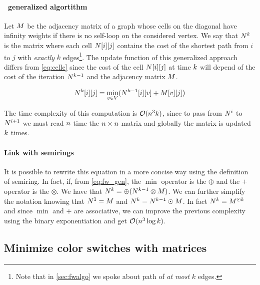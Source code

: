 \paragraph{\FW\ generalized algortithm} Let $M$ be the adjacency matrix of a graph whose cells on the diagonal have infinity weights if there is no self-loop on the considered vertex. We say that $N^k$ is the matrix where each cell $N[i][j]$ contains the cost of the shortest path from $i$ to $j$ with \textit{exactly} $k$ edges\footnote{Note that in \cref{sec:fwalgo} we spoke about path of \textit{at most} $k$ edges.}. The update function of this generalized approach differs from \cref{eq:cellc} since the cost of the cell $N[i][j]$ at time $k$ will depend of the cost of the iteration $N^{k - 1}$ and the adjacency matrix $M$.

\begin{equation}
  \label{eq:fw_gen}
  N^k[i][j] = \min_{v \in V} (N^{k-1}[i][v] + M[v][j])
\end{equation}

The time complexity of this computation is $\mathcal{O}(n^3 k)$, since to pass from $N^i$ to $N^{i+1}$ we must read $n$ time the $n \times n$ matrix and globally the matrix is updated $k$ times.

\paragraph{Link with semirings} It is possible to rewrite this equation in a more concise way using the definition of semiring. In fact, if, from \cref{eq:fw_gen}, the $\min$ operator is the $\oplus$ and the $+$ operator is the $\otimes$. We have that $N^k = \oplus (N^{k-1} \otimes M)$. We can further simplify the notation knowing that $N^1 = M$ and $N^k = N^{k-1} \odot M$. In fact $N^k = M^{\odot k}$ and since $\min$ and $+$ are associative, we can improve the previous complexity using the binary exponentiation \cite{binexp} and get $\mathcal{O}(n^3 \log k)$.


\subsection{Minimize color switches with matrices}
\label{sec:algo_matrix}

